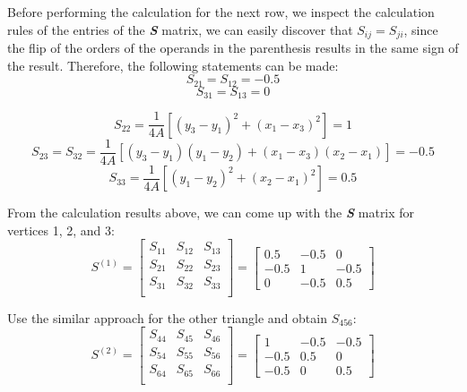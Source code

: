 \documentclass[a4paper,titlepage]{article}
\begin{document}
		Before performing the calculation for the next row, we inspect the calculation rules of the entries of the \textbf{\textit{S}} matrix, we can easily discover that $S_{ij} = S_{ji}$, since the flip of the orders of the operands in the parenthesis results in the same sign of the result. Therefore, the following statements can be made:
		$$
			S_{21} = S_{12} = -0.5
		$$
		$$
			S_{31} = S_{13} = 0
		$$
		
		$$
			S_{22} = \frac{1}{4A}[(y_3 - y_1)^2 + (x_1 - x_3)^2] = 1
		$$
		$$
			S_{23} = S_{32} = \frac{1}{4A}[(y_3 - y_1)(y_1 - y_2) + (x_1 - x_3)(x_2 - x_1)] = -0.5
		$$
		$$
			S_{33} = \frac{1}{4A}[(y_1 - y_2)^2 + (x_2 - x_1)^2] = 0.5
		$$
		
		From the calculation results above, we can come up with the \textbf{\textit{S}} matrix for vertices 1, 2, and 3:
		$$
			S^{(1)} = \begin{bmatrix}
				S_{11} & S_{12} & S_{13}\\
				S_{21} & S_{22} & S_{23} \\
				S_{31} & S_{32} & S_{33} \\
			\end{bmatrix} = 
			\begin{bmatrix}
				0.5 & -0.5 & 0\\
				-0.5 & 1 & -0.5 \\
				0 & -0.5 & 0.5
			\end{bmatrix}
		$$
		
		Use the similar approach for the other triangle and obtain $S_{456}$:
		$$
			S^{(2)} = \begin{bmatrix}
				S_{44} & S_{45} & S_{46}\\
				S_{54} & S_{55} & S_{56} \\
				S_{64} & S_{65} & S_{66} \\
			\end{bmatrix} = 
			\begin{bmatrix}
				1 & -0.5 & -0.5\\
				-0.5 & 0.5 & 0 \\
				-0.5 & 0 & 0.5
			\end{bmatrix}
		$$
		
\end{document}
